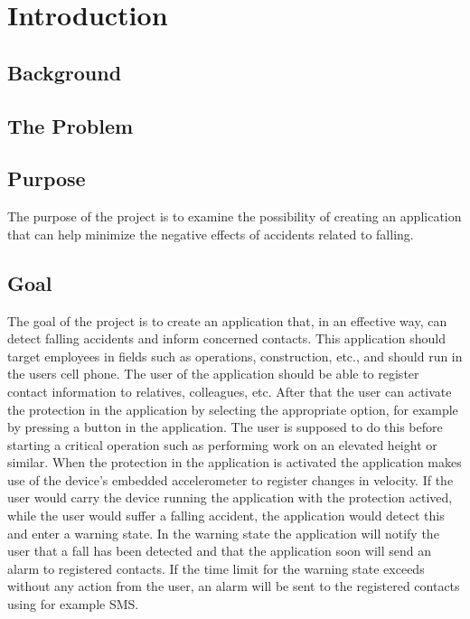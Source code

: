 \documentclass[11pt, a4paper, onecolumn]{article}
\begin{document}
	
	\tableofcontents
	\newpage
	
	\section{Introduction}
	
	\subsection{Background}
	
	\subsection{The Problem}
	
	\subsection{Purpose}
	
	The purpose of the project is to examine the possibility of creating an application that can help minimize the negative effects of accidents related to falling. 
	
	\subsection{Goal}
	
	The goal of the project is to create an application that, in an effective way, can detect falling accidents and inform concerned contacts. This application should target employees in fields such as operations, construction, etc., and should run in the users cell phone. The user of the application should be able to register contact information to relatives, colleagues, etc. After that the user can activate the protection in the application by selecting the appropriate option, for example by pressing a button in the application. The user is supposed to do this before starting a critical operation such as performing work on an elevated height or similar. When the protection in the application is activated the application makes use of the device's embedded accelerometer to register changes in velocity. If the user would carry the device running the application with the protection actived, while the user would suffer a falling accident, the application would detect this and enter a warning state. In the warning state the application will notify the user that a fall has been detected and that the application soon will send an alarm to registered contacts. If the time limit for the warning state exceeds without any action from the user, an alarm will be sent to the registered contacts using for example SMS.   
	
\end{document}
